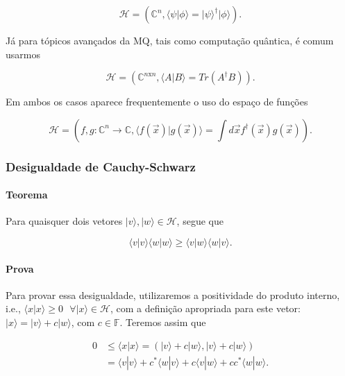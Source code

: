\documentclass[11pt]{article}
\begin{document}
\begin{equation}
\mathcal{H}=\left(\mathbb{C}^{n},\langle\psi|\phi\rangle=|\psi\rangle^{\dagger}|\phi\rangle\right).
\end{equation}

Já para tópicos avançados da MQ, tais como computação quântica, é comum
usarmos

\begin{equation}
\mathcal{H}=\left(\mathbb{C}^{n\text{x}n},\langle A|B\rangle=Tr(A^{\dagger}B)\right).
\end{equation}

Em ambos os casos aparece frequentemente o uso do espaço de funções

\begin{equation}
\mathcal{H}=\left(f,g:\mathbb{C}^{n}\rightarrow\mathbb{C},\langle f(\vec{x})|g(\vec{x})\rangle=\int d\vec{x}f^{\dagger}(\vec{x})g(\vec{x})\right).
\end{equation}

    \subsubsection{Desigualdade de
Cauchy-Schwarz}\label{desigualdade-de-cauchy-schwarz}

\paragraph{Teorema}\label{teorema}

Para quaisquer dois vetores \(|v\rangle,|w\rangle\in\mathcal{H}\), segue
que

\begin{equation}
\langle v|v\rangle\langle w|w\rangle \ge \langle v|w\rangle\langle w|v\rangle.
\end{equation}

\paragraph{Prova}\label{prova}

Para provar essa desigualdade, utilizaremos a positividade do produto
interno, i.e.,
\(\langle x|x\rangle\ge 0\text{ }\forall|x\rangle\in\mathcal{H}\), com a
definição apropriada para este vetor:
\(|x\rangle=|v\rangle+c|w\rangle\), com \(c\in\mathbb{F}\). Teremos
assim que

\begin{align}
0 & \le \langle x|x\rangle = (|v\rangle+c|w\rangle,|v\rangle+c|w\rangle) \\
& = \langle v|v\rangle + c^{*}\langle w|v\rangle + c\langle v|w\rangle + cc^{*}\langle w|w\rangle. 
\end{align}
\end{document}
